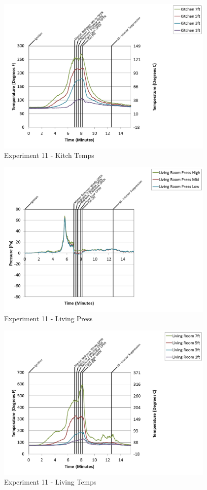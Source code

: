 \documentclass{article}
\begin{document}
\begin{appendices}
\clearpage

\begin{figure}[h!]
	\centering
	\includegraphics[height=3.05in]{0_Images/Results_Charts/Exp_11_Charts/KitchTemps.png}
	\caption{Experiment 11 - Kitch Temps}
\end{figure}


\begin{figure}[h!]
	\centering
	\includegraphics[height=3.05in]{0_Images/Results_Charts/Exp_11_Charts/LivingPress.png}
	\caption{Experiment 11 - Living Press}
\end{figure}

\clearpage

\begin{figure}[h!]
	\centering
	\includegraphics[height=3.05in]{0_Images/Results_Charts/Exp_11_Charts/LivingTemps.png}
	\caption{Experiment 11 - Living Temps}
\end{figure}



\end{appendices}
\end{document}
